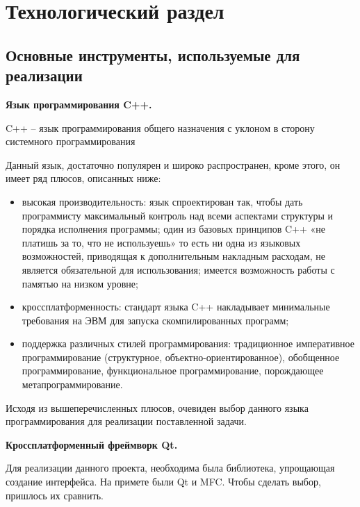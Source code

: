\chapter{Технологический раздел}
\label{cha:impl}


\section{Основные инструменты, используемые для реализации}

\noindent\textbf{Язык программирования C++.}

C++ -- язык программирования общего назначения с уклоном в сторону системного программирования \cite{Cpp}

Данный язык, достаточно популярен и широко распространен, кроме этого, он имеет ряд плюсов, описанных ниже:

\begin{itemize}
	\item высокая производительность: язык спроектирован так, чтобы дать программисту максимальный контроль над всеми аспектами структуры и порядка исполнения программы; один из базовых принципов C++ «не платишь за то, что не используешь» то есть ни одна из языковых возможностей, приводящая к дополнительным накладным расходам, не является обязательной для использования; имеется возможность работы с памятью на низком уровне;
	\item кроссплатформенность: стандарт языка C++ накладывает минимальные требования на ЭВМ для запуска скомпилированных программ;
	\item поддержка различных стилей программирования: традиционное императивное программирование (структурное, объектно-ориентированное), обобщенное программирование, функциональное программирование, порождающее метапрограммирование.
\end{itemize}

Исходя из вышеперечисленных плюсов, очевиден выбор данного языка программирования для реализации поставленной задачи. %

\newpage
\noindent\textbf{Кроссплатформенный фреймворк Qt.}

Для реализации данного проекта, необходима была библиотека, упрощающая создание интерфейса. На примете были Qt и MFC. Чтобы сделать выбор, пришлось их сравнить. 

